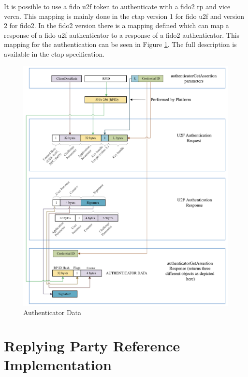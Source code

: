 \documentclass[a4paper, 11pt]{scrartcl}
\begin{document}
It is possible to use a \gls{fido} \gls{u2f} token to authenticate with a \gls{fido2} \gls{rp} and vice verca. This mapping is mainly done in the \gls{ctap} version 1 for \gls{fido} \gls{u2f} and version 2 for \gls{fido2}. In the \gls{fido2} version there is a mapping defined which can map a response of a \gls{fido} \gls{u2f} authenticator to a response of a \gls{fido2} authenticator. This mapping for the authentication can be seen in Figure \ref{fig:authenticationMapping}. The full description is available in the \gls{ctap} specification\cite{yubico:whatIsFido2, ctap:interoperability}.

\begin{figure}[ht]
  \includegraphics[width=16cm]{img/u2fcompat-getassertion.png}
  \centering
  \caption{Authenticator Data}
  \label{fig:authenticationMapping}
\end{figure}


\section{Replying Party Reference Implementation}
\label{sec:replying_party}
\end{document}
